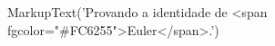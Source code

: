 \documentclass[preview]{standalone}
\begin{document}
\begin{center}
MarkupText('Provando a identidade de <span fgcolor="#FC6255">Euler</span>.')
\end{center}
\end{document}
